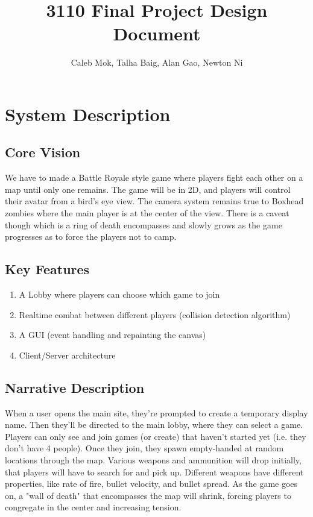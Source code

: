 \documentclass{article}
\author{Caleb Mok, Talha Baig, Alan Gao, Newton Ni}
\title{3110 Final Project Design Document}
\begin{document}
\maketitle

    \section{System Description}

        \subsection{Core Vision}
        We have to made a Battle Royale style game where players fight each other on a map until only one remains. The game will be in 2D, and players will control their avatar from a bird's eye view. The camera system remains true to Boxhead zombies where the main player is at the center of the view. There is a caveat though which is a ring of death encompasses and slowly grows as the game progresses as to force the players not to camp.

        \subsection{Key Features}
        \begin{enumerate}
             \item A Lobby where players can choose which game to join
             \item Realtime combat between different players (collision detection algorithm)
             \item A GUI (event handling and repainting the canvas)
             \item Client/Server architecture 
	\end{enumerate}

        \subsection{Narrative Description}
	When a user opens the main site, they're prompted to create a temporary display name. Then they'll be directed to the main lobby, where they can select a game. Players can only see and join games (or create) that haven't started yet (i.e. they don't have 4 people). Once they join, they spawn empty-handed at random locations through the map. Various weapons and ammunition will drop initially, that players will have to search for and pick up. Different weapons have different properties, like rate of fire, bullet velocity, and bullet spread. As the game goes on, a "wall of death" that encompasses the map will shrink, forcing players to congregate in the center and increasing tension.
\end{document}
